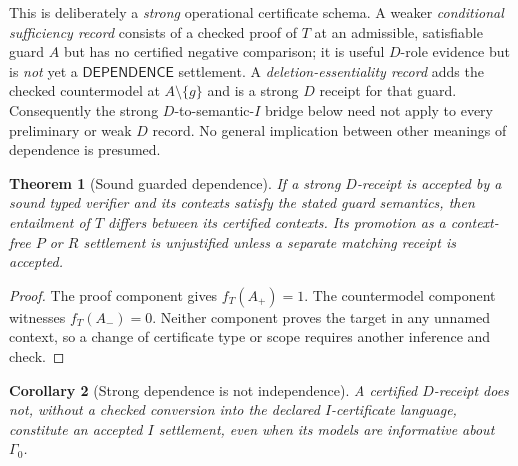 \documentclass[11pt,letterpaper,oneside]{book}
\newtheorem{theorem}{Theorem}[chapter]
\newtheorem{corollary}[theorem]{Corollary}
\theoremstyle{definition}
\theoremstyle{remark}
\begin{document}
This is deliberately a \emph{strong} operational certificate schema.
A weaker \emph{conditional sufficiency record} consists of a checked
proof of $T$ at an admissible, satisfiable guard $A$ but has no
certified negative comparison; it is useful $D$-role evidence but is
\emph{not} yet a $\mathsf{DEPENDENCE}$ settlement. A
\emph{deletion-essentiality record} adds the checked countermodel at
$A\setminus\{g\}$ and is a strong $D$ receipt for that guard.
Consequently the strong $D$-to-semantic-$I$ bridge below need not apply
to every preliminary or weak $D$ record. No general implication
between other meanings of dependence is presumed.

\begin{theorem}[Sound guarded dependence]\label{thm:d}
If a strong $D$-receipt is accepted by a sound typed verifier and its
contexts satisfy the stated guard semantics, then entailment of $T$
differs between its certified contexts. Its promotion as a context-free
$P$ or $R$ settlement is unjustified unless a separate matching
receipt is accepted.
\end{theorem}
\begin{proof}The proof component gives $f_T(A_+)=1$. The countermodel
component witnesses $f_T(A_-)=0$. Neither component proves the target
in any unnamed context, so a change of certificate type or scope
requires another inference and check.\end{proof}
\begin{corollary}[Strong dependence is not independence]
A certified $D$-receipt does not, without a checked conversion into
the declared $I$-certificate language, constitute an accepted $I$
settlement, even when its models are informative about $\Gamma_0$.
\end{corollary}
\end{document}
